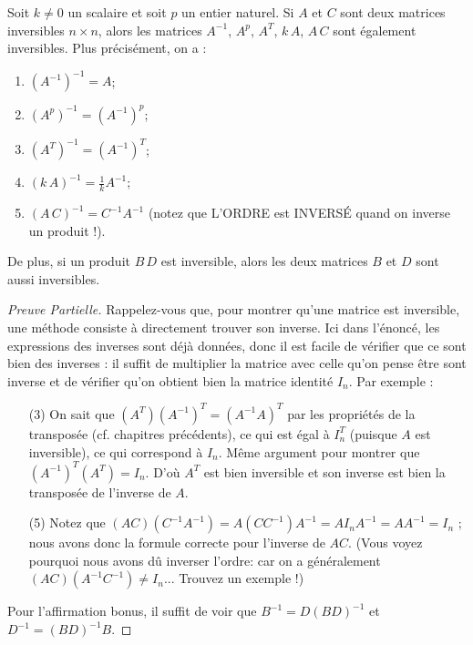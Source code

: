 \begin{proposition} 

Soit $k \neq 0$ un scalaire et soit $p$ un entier naturel. Si $A$ et $C$ sont deux matrices inversibles $n \times n$,
alors les matrices $A^{-1}$, $A^p$, $A^T$, $k\,A$,  $A\,C$ sont également inversibles. Plus précisément, on a :
\begin{enumerate}[(1)]
\item  $(A^{-1})^{-1} = A$;
\item $(A^p)^{-1} = (A^{-1})^p$;
\item  $(A^T)^{-1} = (A^{-1})^T$;
\item   $(k\,A)^{-1} = \frac{1}{k} A^{-1}$;
\item  $(A\,C)^{-1} = C^{-1}A^{-1}$ \quad (notez que L'ORDRE est INVERSÉ quand on inverse un produit !).
\end{enumerate}
De plus, si un produit $B\,D$ est inversible, alors les deux matrices $B$ et $D$ sont aussi inversibles.
\end{proposition}

\begin{proof}[Preuve Partielle]
Rappelez-vous que, pour montrer qu'une matrice est inversible, une méthode consiste à directement trouver son
inverse.  Ici dans l'énoncé, les expressions des inverses sont déjà données, donc il est facile de vérifier que ce sont bien des inverses : il suffit de multiplier la matrice avec celle qu'on pense être sont inverse et de vérifier qu'on obtient bien la matrice identité $I_n$.  
Par exemple :
\begin{itemize}
	\item[(3)] On sait que $(A^T) (A^{-1})^T = (A^{-1}A)^T$ par les propriétés de la transpos\'ee (cf. chapitres précédents), ce qui est égal à $I_n^T$ (puisque $A$ est inversible), ce qui correspond à $I_n$. Même argument pour montrer que $(A^{-1})^T (A^T) =I_n$.  D'où $A^T$
est bien inversible et son inverse est bien la transposée de l'inverse de $A$.
	\item[(5)] Notez que $(AC) (C^{-1}A^{-1}) = A (CC^{-1}) A^{-1} = AI_nA^{-1} = AA^{-1} = I_n$ ; nous avons donc la formule correcte pour l'inverse de $AC$.  (Vous voyez pourquoi nous avons dû inverser l'ordre: car on a généralement $(AC) (A^{-1}C^{-1})\neq I_n$... Trouvez un exemple !)
\end{itemize}
Pour l'affirmation bonus, il suffit de voir que $B^{-1} = D(BD)^{-1}$ et $D^{-1} = (BD)^{-1} B$.
\end{proof}

